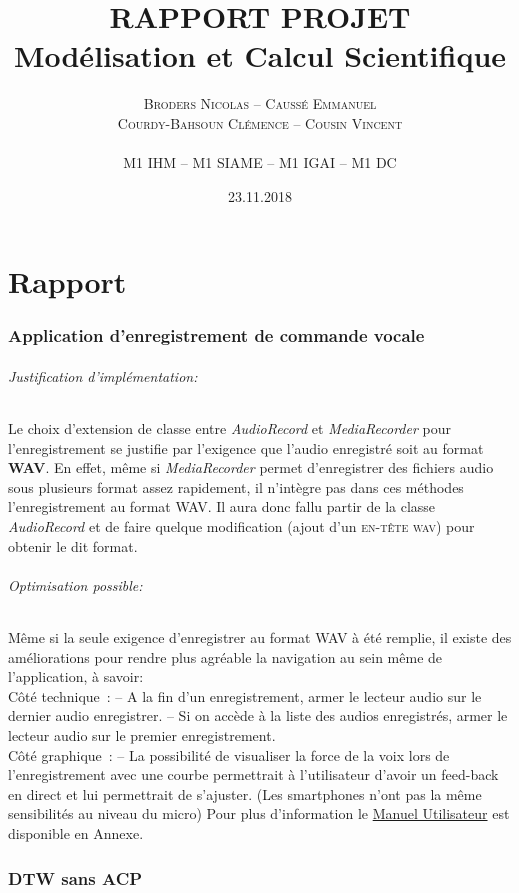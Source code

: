 \documentclass[a4paper,12pt]{report}
\title{\LARGE \textbf{RAPPORT PROJET\\ Modélisation et Calcul Scientifique}}
\author{\textsc{Broders Nicolas -- Caussé Emmanuel }\\
\textsc{Courdy-Bahsoun Clémence -- Cousin Vincent}\\\\
M1 IHM -- M1 SIAME -- M1 IGAI -- M1 DC  \\
}
\date{23.11.2018}
\begin{document}
\maketitle
\newpage

\part*{Rapport}
\section{Application d'enregistrement de commande vocale}
\paragraph{Justification d'implémentation:\\}
Le choix d’extension de classe entre \textit{AudioRecord} et \textit{MediaRecorder} pour l’enregistrement se justifie par l’exigence que l’audio enregistré soit au format \textbf{WAV}. En effet, même si \textit{MediaRecorder} permet d’enregistrer des fichiers audio sous plusieurs format assez rapidement, il n’intègre pas dans ces méthodes l’enregistrement au format WAV. Il aura donc fallu partir de la classe \textit{AudioRecord} et de faire quelque modification (ajout d’un \textsc{en-tête wav}) pour obtenir le dit format.
\paragraph{Optimisation possible:\\}
Même si la seule exigence d’enregistrer au format WAV à été remplie, il existe des améliorations pour rendre plus agréable la navigation au sein même de l’application, à savoir:\\
Côté technique :
-- A la fin d’un enregistrement, armer le lecteur audio sur le dernier audio enregistrer.
-- Si on accède à la liste des audios enregistrés, armer le lecteur audio sur le premier enregistrement.\\
Côté graphique :
-- La possibilité de visualiser la force de la voix lors de l’enregistrement avec une courbe permettrait à l’utilisateur d’avoir un feed-back en direct et lui permettrait de s’ajuster.
(Les smartphones n’ont pas la même sensibilités au niveau du micro)
 Pour plus d'information le \hyperref[chap:Manuel]{Manuel Utilisateur} est disponible en Annexe.\\
 
 \newpage
\section{ DTW sans ACP}
\end{document}
